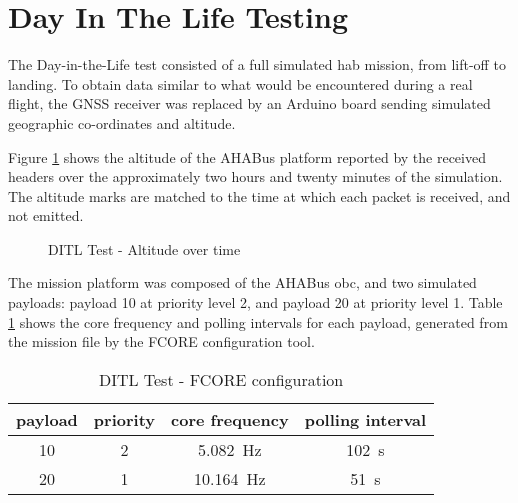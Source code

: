 \section{Day In The Life Testing}
\label{ssec:results-ditl}

The Day-in-the-Life test consisted of a full simulated \acrlong{hab} mission,
from lift-off to landing. To obtain data similar to what would be encountered
during a real flight, the GNSS receiver was replaced by an Arduino board 
sending simulated geographic co-ordinates and altitude.

Figure \ref{fig:dit-alt} shows the altitude of the AHABus platform reported by
the received headers over the approximately two hours and twenty minutes of the
simulation. The altitude marks are matched to the time at which each packet
is received, and not emitted.

\begin{figure}[h]
\centering
\caption{DITL Test - Altitude over time}
\label{fig:dit-alt}
\end{figure}

The mission platform was composed of the AHABus \acrlong{obc}, and two simulated
payloads: payload 10 at priority level 2, and payload 20 at priority level 1.
Table \ref{tab:ditl-cfg} shows the core frequency and polling intervals for
each payload, generated from the mission file by the FCORE configuration tool.

\begin{table}[h]
\begin{center}
\begin{tabular}{c||c c c}

payload & priority & core frequency & polling interval \\ \hline
10 & 2 & \SI{5.082}{\hertz} & \SI{102}{\second} \\
20 & 1 & \SI{10.164}{\hertz} & \SI{51}{\second} \\

\end{tabular}
\end{center}
\caption {DITL Test - FCORE configuration}
\label{tab:ditl-cfg}
\end{table}

